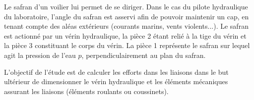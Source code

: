 \documentclass[10pt]{article}
\begin{document}
\vspace{.5cm}

Le safran d'un voilier lui permet de se diriger. Dans le cas du pilote hydraulique du laboratoire, l'angle du safran est asservi afin de pouvoir maintenir un cap, en tenant compte des aléas extérieurs (courants marins, vents violents...). Le safran est actionné par un vérin hydraulique, la pièce 2 étant relié à la tige du vérin et la pièce 3 constituant le corps du vérin. La pièce 1 représente le safran sur lequel agit la pression de l'eau $p$, perpendiculairement au plan du safran. 

L'objectif de l'étude est de calculer les efforts dans les liaisons dans le but ultérieur de dimensionner le vérin hydraulique et les éléments mécaniques assurant les liaisons (éléments roulants ou coussinets). 

\vspace{.5cm}


\setcounter{subparagraph}{0}
\end{document}
